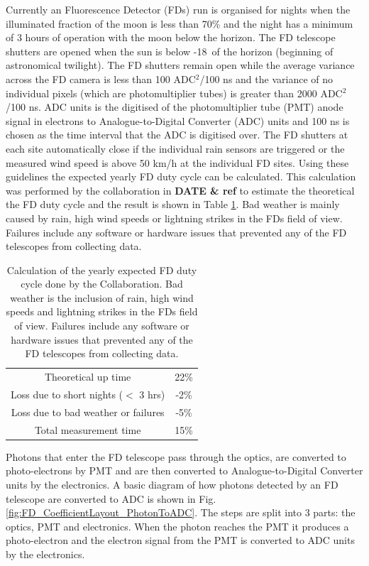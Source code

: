 Currently an Fluorescence Detector (FDs) run is organised for nights when the illuminated fraction of the moon is less than 70\% and the night has a minimum of 3 hours of operation with the moon below the horizon. The FD telescope shutters are opened when the sun is below -18\textdegree \ of the horizon (beginning of astronomical twilight). The FD shutters remain open while the average variance across the FD camera is less than 100 ADC$^2$/100 ns and the variance of no individual pixels (which are photomultiplier tubes) is greater than 2000 ADC$^2$/100 ns. ADC units is the digitised of the photomultiplier tube (PMT) anode signal in electrons to Analogue-to-Digital Converter (ADC) units and 100 ns is chosen as the time interval that the ADC is digitised over. The FD shutters at each site automatically close if the individual rain sensors are triggered or the measured wind speed is above 50 km/h at the individual FD sites. Using these guidelines the expected yearly FD duty cycle can be calculated. This calculation was performed by the collaboration in \textbf{DATE \& ref} to estimate the theoretical the FD duty cycle and the result is shown in Table \ref{tab:FD_uptime}. Bad weather is mainly caused by rain, high wind speeds or lightning strikes in the FDs field of view. Failures include any software or hardware issues that prevented any of the FD telescopes from collecting data.

\begin{table}[h]
\centering
\begin{tabular}{ c c }
\hline\hline
Theoretical up time & 22\% \\
Loss due to short nights ($<$ 3 hrs) & -2\% \\
Loss due to bad weather or failures & -5\% \\ \hline \hline
Total measurement time & 15\% \\
\hline\hline
\end{tabular}
\caption{Calculation of the yearly expected FD duty cycle done by the Collaboration. Bad weather is the inclusion of rain, high wind speeds and lightning strikes in the FDs field of view. Failures include any software or hardware issues that prevented any of the FD telescopes from collecting data.} \label{tab:FD_uptime}
\end{table}


Photons that enter the FD telescope pass through the optics, are converted to photo-electrons by PMT and are then converted to Analogue-to-Digital Converter units by the electronics. A basic diagram of how photons detected by an FD telescope are converted to ADC is shown in Fig. \ref{fig:FD_CoefficientLayout_PhotonToADC}. The steps are split into 3 parts: the optics, PMT and electronics. When the photon reaches the PMT it produces a photo-electron and the electron signal from the PMT is converted to ADC units by the electronics. 

